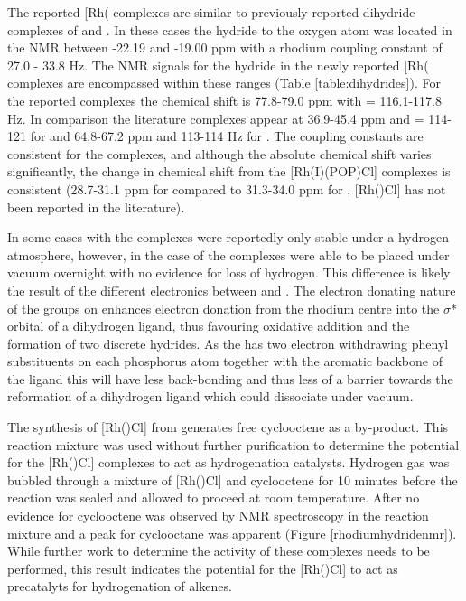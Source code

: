 The reported [Rh(\tBuxantphosk\ce{)(H)2Cl]} complexes are similar to previously reported dihydride complexes of \iPrxantphos{}\cite{Esteruelas2013, Esteruelas2013b} and \Phxantphos{}\cite{Dallanegra2012, Johnson2013, Pawley2010}.   In these cases the hydride \trans{} to the oxygen atom was located in the \proton{} NMR between -22.19 and -19.00 ppm with a rhodium coupling constant of 27.0 - 33.8 Hz.  The \proton{} NMR signals for the hydride in the newly reported [Rh(\tBuxantphosk\ce{)(H)2Cl]} complexes are encompassed within these ranges (Table \ref{table:dihydrides}).  For the reported \tBuxantphos{} complexes the \phosphorus{} chemical shift is 77.8-79.0 ppm with \JRhP{} = 116.1-117.8 Hz.  In comparison the literature complexes appear at 36.9-45.4 ppm and \JRhP{} = 114-121 for \Phxantphos{} and 64.8-67.2 ppm and 113-114 Hz for \iPrxantphos{}.  The coupling constants are consistent for the complexes, and although the absolute chemical shift varies significantly, the change in chemical shift from the [Rh(I)(POP)Cl] complexes is consistent (28.7-31.1 ppm for \iPrxantphos{} compared to 31.3-34.0 ppm for \tBuxantphos{}, [Rh(\Phxantphos)Cl] has not been reported in the literature).  

In some cases with \Phxantphos{} the complexes were reportedly only stable under a hydrogen atmosphere,\cite{Johnson2013, Dallanegra2012} however, in the case of \tBuxantphos{} the complexes were able to be placed under vacuum overnight with no evidence for loss of hydrogen.  This difference is likely the result of the different electronics between \tBuxantphos{} and \Phxantphos{}.  The electron donating nature of the \tBu{} groups on \tBuxantphos{} enhances electron donation from the rhodium centre into the $\sigma$* orbital of a dihydrogen ligand, thus favouring oxidative addition and the formation of two discrete hydrides.  As the \Phxantphos{} has two electron withdrawing phenyl substituents on each phosphorus atom together with the aromatic backbone of the ligand this will have less back-bonding and thus less of a barrier towards the reformation of a dihydrogen ligand which could dissociate under vacuum.  

The synthesis of [Rh(\tBuxantphosk)Cl] from  generates free cyclooctene as a by-product.  This reaction mixture was used without further purification to determine the potential for the [Rh(\tBuxantphosk)Cl] complexes to act as hydrogenation catalysts.  Hydrogen gas was bubbled through a mixture of [Rh(\tBuxantphosk)Cl] and cyclooctene for 10 minutes before the reaction was sealed and allowed to proceed at room temperature.  After  no evidence for cyclooctene was observed by \proton{} NMR spectroscopy in the reaction mixture and a peak for cyclooctane was apparent (Figure \ref{rhodiumhydridenmr}).  While further work to determine the activity of these complexes needs to be performed, this result indicates the potential for the [Rh(\tBuxantphosk)Cl] to act as precatalyts for hydrogenation of alkenes.  

